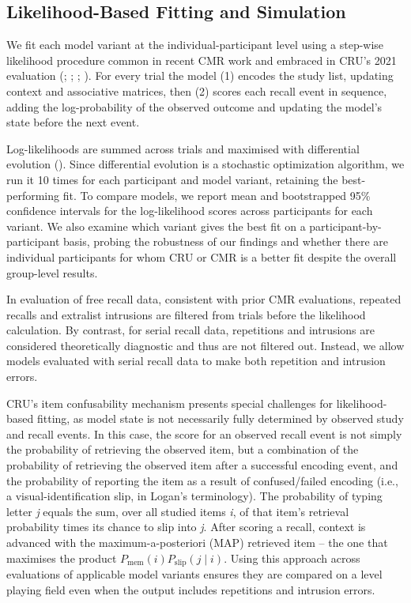 \documentclass[
  man,
  floatsintext,
  longtable,
  nolmodern,
  notxfonts,
  notimes,
  draftfirst,
  colorlinks=true,linkcolor=blue,citecolor=blue,urlcolor=blue]{apa7}
\begin{document}
\subsection{Likelihood-Based Fitting and
Simulation}\label{likelihood-based-fitting-and-simulation}

We fit each model variant at the individual-participant level using a
step-wise likelihood procedure common in recent CMR work and embraced in
CRU's 2021 evaluation (; ;
;
). For every trial the
model (1) encodes the study list, updating context and associative
matrices, then (2) scores each recall event in sequence, adding the
log-probability of the observed outcome and updating the model's state
before the next event.

Log-likelihoods are summed across trials and maximised with differential
evolution ().
Since differential evolution is a stochastic optimization algorithm, we
run it 10 times for each participant and model variant, retaining the
best-performing fit. To compare models, we report mean and bootstrapped
95\% confidence intervals for the log-likelihood scores across
participants for each variant. We also examine which variant gives the
best fit on a participant-by-participant basis, probing the robustness
of our findings and whether there are individual participants for whom
CRU or CMR is a better fit despite the overall group-level results.

In evaluation of free recall data, consistent with prior CMR
evaluations, repeated recalls and extralist intrusions are filtered from
trials before the likelihood calculation. By contrast, for serial recall
data, repetitions and intrusions are considered theoretically diagnostic
and thus are not filtered out. Instead, we allow models evaluated with
serial recall data to make both repetition and intrusion errors.

CRU's item confusability mechanism presents special challenges for
likelihood-based fitting, as model state is not necessarily fully
determined by observed study and recall events. In this case, the score
for an observed recall event is not simply the probability of retrieving
the observed item, but a combination of the probability of retrieving
the observed item after a successful encoding event, and the probability
of reporting the item as a result of confused/failed encoding (i.e., a
visual-identification slip, in Logan's terminology). The probability of
typing letter \emph{j} equals the sum, over all studied items \emph{i},
of that item's retrieval probability times its chance to slip into
\emph{j}. After scoring a recall, context is advanced with the
maximum-a-posteriori (MAP) retrieved item -- the one that maximises the
product \(P_{\text{mem}}(i)P_{\text{slip}}(j\mid i)\). Using this
approach across evaluations of applicable model variants ensures they
are compared on a level playing field even when the output includes
repetitions and intrusion errors.
\end{document}
